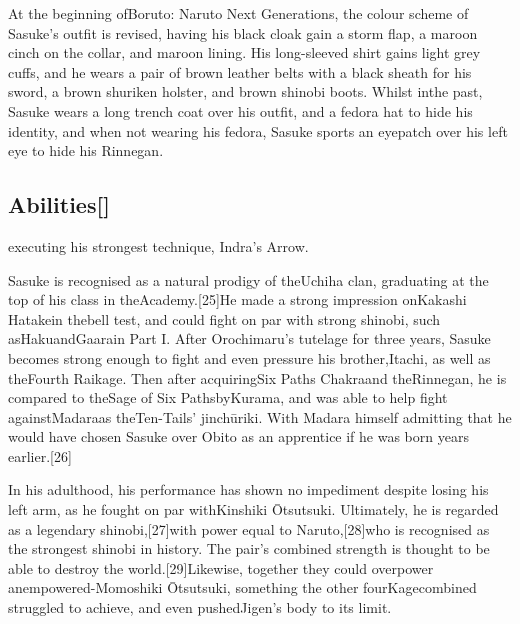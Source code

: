 \documentclass[a4paper,12pt]{article}
\begin{document}
At the beginning ofBoruto: Naruto Next Generations, the colour scheme of Sasuke's outfit is revised, having his black cloak gain a storm flap, a maroon cinch on the collar, and maroon lining. His long-sleeved shirt gains light grey cuffs, and he wears a pair of brown leather belts with a black sheath for his sword, a brown shuriken holster, and brown shinobi boots. Whilst inthe past, Sasuke wears a long trench coat over his outfit, and a fedora hat to hide his identity, and when not wearing his fedora, Sasuke sports an eyepatch over his left eye to hide his Rinnegan.\\ \par \vspace{0.5cm}

\subsection*{Abilities[]}\n\nSasuke executing his strongest technique, Indra's Arrow.\\ \par \vspace{0.5cm}

Sasuke is recognised as a natural prodigy of theUchiha clan, graduating at the top of his class in theAcademy.[25]He made a strong impression onKakashi Hatakein thebell test, and could fight on par with strong shinobi, such asHakuandGaarain Part I. After Orochimaru's tutelage for three years, Sasuke becomes strong enough to fight and even pressure his brother,Itachi, as well as theFourth Raikage. Then after acquiringSix Paths Chakraand theRinnegan, he is compared to theSage of Six PathsbyKurama, and was able to help fight againstMadaraas theTen-Tails' jinchūriki. With Madara himself admitting that he would have chosen Sasuke over Obito as an apprentice if he was born years earlier.[26]\\ \par \vspace{0.5cm}

In his adulthood, his performance has shown no impediment despite losing his left arm, as he fought on par withKinshiki Ōtsutsuki. Ultimately, he is regarded as a legendary shinobi,[27]with power equal to Naruto,[28]who is recognised as the strongest shinobi in history. The pair's combined strength is thought to be able to destroy the world.[29]Likewise, together they could overpower anempowered-Momoshiki Ōtsutsuki, something the other fourKagecombined struggled to achieve, and even pushedJigen's body to its limit.\\ \par \vspace{0.5cm}
\end{document}
